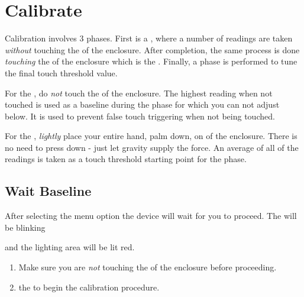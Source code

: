 \pagebreak
\section{Calibrate} \label{Touch Calibration} 

Calibration involves \num{3} phases.  First is a , where a number of
readings are taken \textit{without} touching the  of the enclosure.
After completion, the same process is done \textit{touching} the  of the
enclosure which is the .  Finally, a  phase is performed to
tune the final touch threshold value.

\par\medskip

For the , do \textit{not} touch the  of the enclosure.  The
highest reading when not touched is used as a baseline during the 
phase for which you can not adjust below.  It is used to prevent false touch
triggering when not being touched.

\par\medskip

For the , \textit{lightly} place your entire hand, palm down, on
 of the enclosure.  There is no need to press down - just let gravity
supply the force.  An average of all of the readings is taken as a touch
threshold starting point for the  phase.

\subsection{Wait Baseline} 

After selecting the  menu option the device will wait for you to
proceed.  The  will be blinking

\begin{figure}[H]
\centering
\end{figure}

and the lighting area will be lit red.

\begin{enumerate}
  \item Make sure you are \textit{not} touching the  of the enclosure
    before proceeding.
  \item {} the  to begin the calibration procedure.
\end{enumerate}

